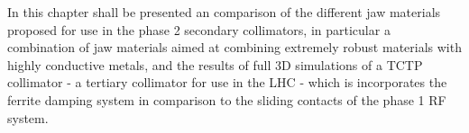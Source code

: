 In this chapter shall be presented an comparison of the different jaw materials proposed for use in the phase 2 secondary collimators, in particular a combination of jaw materials aimed at combining extremely robust materials with highly conductive metals, and the results of full 3D simulations of a TCTP collimator - a tertiary collimator for use in the LHC - which is incorporates the ferrite damping system in comparison to the sliding contacts of the phase 1 RF system. 



%
%
%
%
%
%


